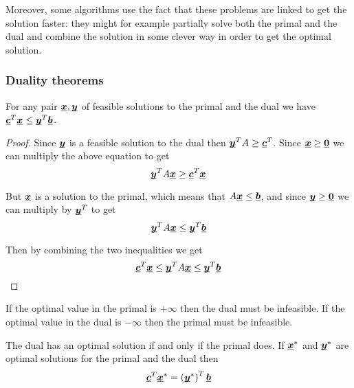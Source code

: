 \documentclass[12pt]{extarticle}
\renewcommand{\vec}[1]{\uvec{#1}}
\begin{document}
Moreover, some algorithms use the fact that these problems are linked to get the solution faster:
they might for example partially solve both the primal and the dual and combine the solution in some clever way in order to get the optimal solution.

\subsubsection{Duality theorems}

\begin{theorem}
    For any pair $\vec x, \vec y$ of feasible solutions to the primal and the dual we have $\vec c^T \vec x \leq \vec y^T \vec b$.
\end{theorem}

\begin{proof}
    Since $\vec y$ is a feasible solution to the dual then $\vec y^T A \geq \vec c^T$.
    Since $\vec x \geq \vec 0$ we can multiply the above equation to get
    \begin{equation}
        \vec y^T A \vec x \geq \vec c^T \vec x
    \end{equation}

    But $\vec x$ is a solution to the primal, which means that $A \vec x \leq \vec b$, and since $\vec y \geq \vec 0$ we can multiply by $\vec y^T$ to get
    \begin{equation}
        \vec y^T A \vec x \leq \vec y^T \vec b
    \end{equation}

    Then by combining the two inequalities we get
    \begin{equation}
        \vec c^T \vec x \leq \vec y^T A \vec x \leq \vec y^T \vec b
    \end{equation}
\end{proof}

\begin{theorem}
    If the optimal value in the primal is $+\infty$ then the dual must be infeasible.
    If the optimal value in the dual is $-\infty$ then the primal must be infeasible.
\end{theorem}

\begin{theorem}
    \label{thm:linear:strong_duality}
    The dual has an optimal solution if and only if the primal does.
    If $\vec x^*$ and $\vec y^*$ are optimal solutions for the primal and the dual then
    \begin{equation}
        \vec c^T \vec x^* = \left(\vec y^*\right)^T \vec b
    \end{equation}
\end{theorem}
\end{document}
